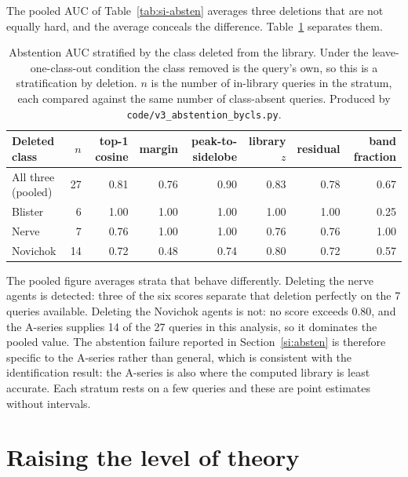 \documentclass[11pt]{article}
\begin{document}
The pooled AUC of Table~\ref{tab:si-absten} averages three deletions that are not equally
hard, and the average conceals the difference. Table~\ref{tab:si-abstbycls} separates them.

\begin{table}[htbp]
\centering
\caption{Abstention AUC stratified by the class deleted from the library. Under the
leave-one-class-out condition the class removed is the query's own, so this is a
stratification by deletion. $n$ is the number of in-library queries in the stratum, each
compared against the same number of class-absent queries. Produced by
\texttt{code/v3\_abstention\_bycls.py}.}
\label{tab:si-abstbycls}
\small
\begin{tabular}{lrrrrrrr}
\toprule
Deleted class & $n$ & top-1 cosine & margin & peak-to-sidelobe & library $z$ & residual & band fraction \\
\midrule
All three (pooled) & 27 & 0.81 & 0.76 & 0.90 & 0.83 & 0.78 & 0.67 \\
\addlinespace
Blister & 6 & 1.00 & 1.00 & 1.00 & 1.00 & 1.00 & 0.25 \\
Nerve & 7 & 0.76 & 1.00 & 1.00 & 0.76 & 0.76 & 1.00 \\
Novichok & 14 & 0.72 & 0.48 & 0.74 & 0.80 & 0.72 & 0.57 \\
\bottomrule
\end{tabular}

\begin{flushleft}\footnotesize The pooled figure averages strata that behave differently.
Deleting the nerve agents is detected: three of the six scores separate that deletion
perfectly on the 7 queries available. Deleting the Novichok
agents is not: no score exceeds 0.80, and the
A-series supplies 14 of the 27 queries in this analysis, so it dominates the
pooled value. The abstention failure reported in Section~\ref{si:absten} is therefore
specific to the A-series rather than general, which is consistent with the identification
result: the A-series is also where the computed library is least accurate. Each stratum
rests on a few queries and these are point estimates without intervals.\end{flushleft}
\end{table}
\clearpage

\section{Raising the level of theory}
\label{si:theory}
\end{document}
